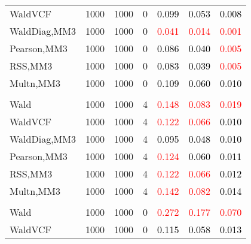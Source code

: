 \documentclass[
]{article}
\begin{document}
\begin{table}[H]
{\begin{tabular}[t]{lrrrrrr}
\hspace{1em}WaldVCF & 1000 & 1000 & 0 & \textcolor{black}{0.099} & \textcolor{black}{0.053} & \textcolor{black}{0.008}\\
\hspace{1em}WaldDiag,MM3 & 1000 & 1000 & 0 & \textcolor{red}{0.041} & \textcolor{red}{0.014} & \textcolor{red}{0.001}\\
\hspace{1em}Pearson,MM3 & 1000 & 1000 & 0 & \textcolor{black}{0.086} & \textcolor{black}{0.040} & \textcolor{red}{0.005}\\
\hspace{1em}RSS,MM3 & 1000 & 1000 & 0 & \textcolor{black}{0.083} & \textcolor{black}{0.039} & \textcolor{red}{0.005}\\
\hspace{1em}Multn,MM3 & 1000 & 1000 & 0 & \textcolor{black}{0.109} & \textcolor{black}{0.060} & \textcolor{black}{0.010}\\
\addlinespace[0.3em]
\multicolumn{7}{l}{\textbf{1F 15V}}\\
\hspace{1em}Wald & 1000 & 1000 & 4 & \textcolor{red}{0.148} & \textcolor{red}{0.083} & \textcolor{red}{0.019}\\
\hspace{1em}WaldVCF & 1000 & 1000 & 4 & \textcolor{red}{0.122} & \textcolor{red}{0.066} & \textcolor{black}{0.010}\\
\hspace{1em}WaldDiag,MM3 & 1000 & 1000 & 4 & \textcolor{black}{0.095} & \textcolor{black}{0.048} & \textcolor{black}{0.010}\\
\hspace{1em}Pearson,MM3 & 1000 & 1000 & 4 & \textcolor{red}{0.124} & \textcolor{black}{0.060} & \textcolor{black}{0.011}\\
\hspace{1em}RSS,MM3 & 1000 & 1000 & 4 & \textcolor{red}{0.122} & \textcolor{red}{0.066} & \textcolor{black}{0.012}\\
\hspace{1em}Multn,MM3 & 1000 & 1000 & 4 & \textcolor{red}{0.142} & \textcolor{red}{0.082} & \textcolor{black}{0.014}\\
\addlinespace[0.3em]
\multicolumn{7}{l}{\textbf{2F 10V}}\\
\hspace{1em}Wald & 1000 & 1000 & 0 & \textcolor{red}{0.272} & \textcolor{red}{0.177} & \textcolor{red}{0.070}\\
\hspace{1em}WaldVCF & 1000 & 1000 & 0 & \textcolor{black}{0.115} & \textcolor{black}{0.058} & \textcolor{black}{0.013}\\

\end{tabular}}
\end{table}
\end{document}
